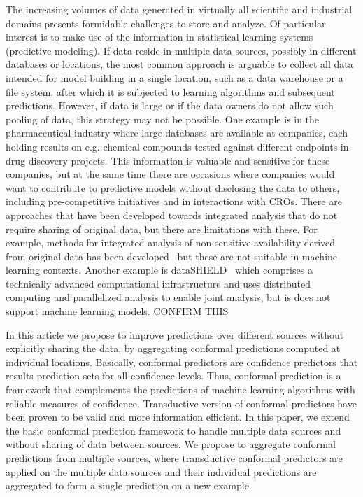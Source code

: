\documentclass[main]{subfiles}
\newcommand{\todo}[1]{{\color{blue} #1 }}
\begin{document}
The increasing volumes of data generated in virtually all scientific and industrial domains presents formidable challenges to store and analyze. Of particular interest is to make use of the information in statistical learning systems (predictive modeling). If data reside in multiple data sources, possibly in different databases or locations, the most common approach is arguable to collect all data intended for model building in a single location, such as a data warehouse or a file system, after which it is subjected to learning algorithms and subsequent predictions. However, if data is large or if the data owners do not allow such pooling of data, this strategy may not be possible. One example is in the pharmaceutical industry where large databases are available at companies, each holding results on e.g. chemical compounds tested against different endpoints in drug discovery projects. This information is valuable and sensitive for these companies, but at the same time there are occasions where companies would want to contribute to predictive models without disclosing the data to others, including pre-competitive initiatives and in interactions with CROs. There are approaches that have been developed towards integrated analysis that do not require sharing of original data, but there are limitations with these. For example, methods for integrated analysis of non-sensitive availability derived from original data has been developed~\cite{Spjuth:2016ly} but these are not suitable in machine learning contexts. Another example is dataSHIELD~\cite{Gaye:2014sf} which comprises a technically advanced computational infrastructure and uses distributed computing and parallelized analysis to enable joint analysis, but is does not support machine learning models. \todo{CONFIRM THIS}
 
In this article we propose to improve predictions over different sources without explicitly sharing the data, by aggregating conformal predictions computed at individual locations. 
Basically, conformal predictors are confidence predictors that results prediction sets for all confidence levels. Thus, conformal prediction is a framework that complements the predictions of machine learning algorithms with reliable measures of confidence.
Transductive version of conformal predictors have been proven to be valid and more information efficient. In this paper, we extend the basic conformal prediction framework to handle multiple data sources and without sharing of data between sources. We propose to aggregate conformal predictions from multiple sources, where transductive conformal predictors are applied on the multiple data sources and their individual predictions are aggregated to form a single prediction on a new example.
\end{document}
